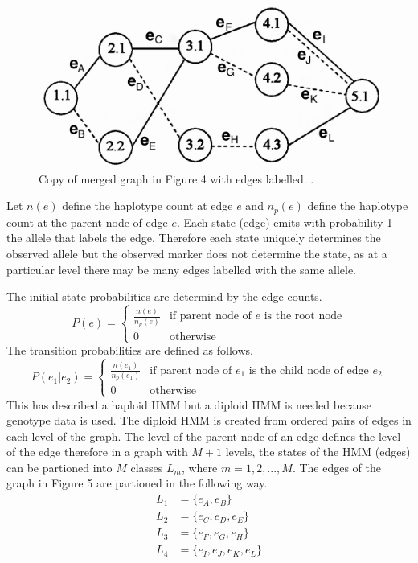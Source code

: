 \documentclass[a4paper,11pt,twoside,abstraction,titlepage]{article}
\begin{document}
\begin{figure}[htp!]
\begin{center}
\centerline{\includegraphics[scale=0.08]{fig5}}
\caption{Copy of merged graph in Figure 4 with edges labelled. \cite{beagle1}.}
\end{center}
\vspace{-20pt}
\end{figure}

\noindent Let $n(e)$ define the haplotype count at edge $e$ and $n_p(e)$ define the haplotype count at the parent node of edge $e$.  Each state (edge) emits with probability 1 the allele that labels the edge.  Therefore each state uniquely determines the observed allele but the observed marker does not determine the state, as at a particular level there may be many edges labelled with the same allele.

\noindent The initial state probabilities are determind by the edge counts.  
\begin{equation*}
P(e) = 
\begin{cases}
\frac{n(e)}{n_p(e)} & \mbox{if parent node of $e$ is the root node} \\
0  & \mbox{otherwise}
\end{cases}
\end{equation*}
The transition probabilities are defined as follows.
\begin{equation*}
P(e_1|e_2) = 
\begin{cases}
\frac{n(e_1)}{n_p(e_1)} & \mbox{if parent node of $e_1$ is the child node of edge $e_2$} \\
0  & \mbox{otherwise}
\end{cases}
\end{equation*}
This has described a haploid HMM but a diploid HMM is needed because genotype data is used.  The diploid HMM is created from ordered pairs of edges in each level of the graph.  The level of the parent node of an edge defines the level of the edge therefore in a graph with $M+1$ levels, the states of the HMM (edges) can be partioned into $M$ classes $L_m$, where $m=1,2,...,M$.  The edges of the graph in Figure 5 are partioned in the following way.
\vspace{-10pt}
\begin{align*}
L_1 &= \{e_{A}, e_{B}\} \\
L_2 &= \{e_{C}, e_{D}, e_{E}\}\\
L_3 &= \{e_{F}, e_{G}, e_{H}\} \\
L_4 &= \{e_{I}, e_{J}, e_{K}, e_{L}\}
\end{align*}
\end{document}
